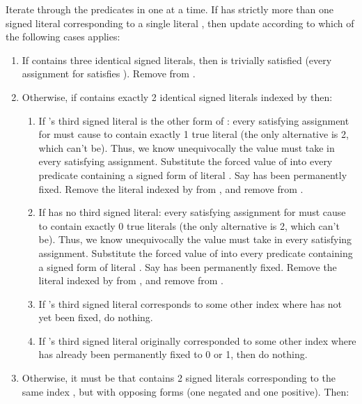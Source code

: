 \documentclass{article}
\begin{document}
Iterate through the predicates in  one at a time.  If  has strictly more than one signed literal corresponding to a single literal , then update  according to which of the following cases applies:
\begin{enumerate}
\item If  contains three identical signed literals, then  is trivially satisfied (every assignment for  satisfies ). Remove  from .
\item Otherwise, if  contains exactly 2 identical signed literals indexed by  then:
\begin{enumerate}
\item If 's third signed literal is the other form of : every satisfying assignment for  must cause  to contain exactly 1 true literal (the only alternative is 2, which can't be). Thus, we know unequivocally the value  must take in every satisfying assignment. Substitute the forced value of  into every predicate containing a signed form of literal . Say  has been permanently fixed. Remove the literal indexed by  from , and remove  from . 
\item If  has no third signed literal: every satisfying assignment for  must cause  to contain exactly 0 true literals (the only alternative is 2, which can't be). Thus, we know unequivocally the value  must take in every satisfying assignment. Substitute the forced value of  into every predicate containing a signed form of literal . Say  has been permanently fixed. Remove the literal indexed by  from , and remove  from . 

\item If 's third signed literal corresponds to some other index  where  has not yet been fixed, do nothing.

\item If 's third signed literal originally corresponded to some other index  where  has already been permanently fixed to 0 or 1, then do nothing. 

\end{enumerate}
\item Otherwise, it must be that  contains 2 signed literals corresponding to the same index , but with opposing forms (one negated and one positive).  Then:
\begin{enumerate}



\end{enumerate}
\end{enumerate}
\end{document}
